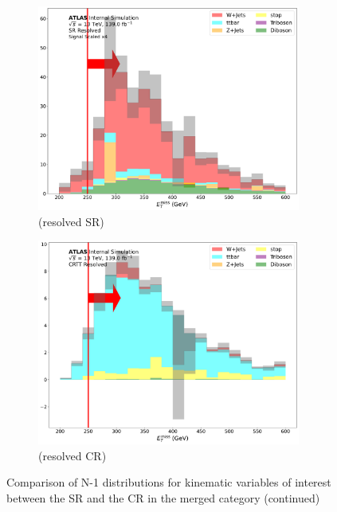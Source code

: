 \begin{figure}[htbp]
    \begin{subfigure}{0.45\textwidth}
     \includegraphics[width = 0.95\textwidth]{Figures/App_SR_CR_distributions/SR1L_Resolved/MetTST_met_N_1.pdf}
    \caption{\met (resolved SR)}
     \end{subfigure}
    \begin{subfigure}{0.45\textwidth}
     \includegraphics[width = 0.95\textwidth]{Figures/App_SR_CR_distributions/CRTT_Resolved/MetTST_met_N_1.pdf}
     \caption{\met (resolved \ttbar CR)}
     \end{subfigure}

     \caption{Comparison of N-1 distributions for kinematic variables of interest between the SR and the \ttbar CR in the merged category (continued)}
  \end{figure}

